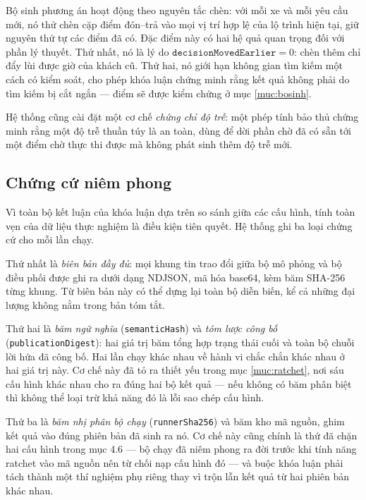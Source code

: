 Bộ sinh phương án hoạt động theo nguyên tắc chèn: với mỗi xe và mỗi yêu cầu mới, nó thử chèn
cặp điểm đón--trả vào mọi vị trí hợp lệ của lộ trình hiện tại, giữ nguyên thứ tự các điểm đã có.
Đặc điểm này có hai hệ quả quan trọng đối với phần lý thuyết. Thứ nhất, nó là lý do
$\mathtt{decisionMovedEarlier} = 0$: chèn thêm chỉ đẩy lùi được giờ của khách cũ. Thứ hai, nó
giới hạn không gian tìm kiếm một cách có kiểm soát, cho phép khóa luận chứng minh rằng kết quả
không phải do tìm kiếm bị cắt ngắn --- điểm sẽ được kiểm chứng ở mục \ref{muc:bosinh}.

Hệ thống cũng cài đặt một cơ chế \emph{chứng chỉ độ trễ}: một phép tính bảo thủ chứng minh rằng
một độ trễ thuần túy là an toàn, dùng để dời phần chờ đã có sẵn tới một điểm chờ thực thi được
mà không phát sinh thêm độ trễ mới.

\subsection{Chứng cứ niêm phong}

Vì toàn bộ kết luận của khóa luận dựa trên so sánh giữa các cấu hình, tính toàn vẹn của dữ liệu
thực nghiệm là điều kiện tiên quyết. Hệ thống ghi ba loại chứng cứ cho mỗi lần chạy.

Thứ nhất là \emph{biên bản đầy đủ}: mọi khung tin trao đổi giữa bộ mô phỏng và bộ điều phối
được ghi ra dưới dạng NDJSON, mã hóa base64, kèm băm SHA-256 từng khung. Từ biên bản này có thể
dựng lại toàn bộ diễn biến, kể cả những đại lượng không nằm trong bản tóm tắt.

Thứ hai là \emph{băm ngữ nghĩa} (\texttt{semanticHash}) và \emph{tóm lược công bố}
(\texttt{publicationDigest}): hai giá trị băm tổng hợp trạng thái cuối và toàn bộ chuỗi lời hứa
đã công bố. Hai lần chạy khác nhau về hành vi chắc chắn khác nhau ở hai giá trị này. Cơ chế
này đã tỏ ra thiết yếu trong mục \ref{muc:ratchet}, nơi sáu cấu hình khác nhau cho ra đúng hai bộ kết quả ---
nếu không có băm phân biệt thì không thể loại trừ khả năng đó là lỗi sao chép cấu hình.

Thứ ba là \emph{băm nhị phân bộ chạy} (\texttt{runnerSha256}) và băm kho mã nguồn, ghim kết quả
vào đúng phiên bản đã sinh ra nó. Cơ chế này cũng chính là thứ đã chặn hai cấu hình trong mục
4.6 --- bộ chạy đã niêm phong ra đời trước khi tính năng ratchet vào mã nguồn nên từ chối nạp
cấu hình đó --- và buộc khóa luận phải tách thành một thí nghiệm phụ riêng thay vì trộn lẫn kết
quả từ hai phiên bản khác nhau.
